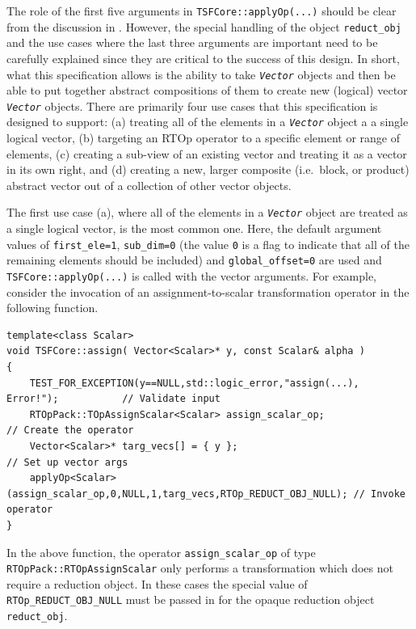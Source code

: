 The role of the first five arguments in \texttt{TSFCore::applyOp(\-...)}
should be clear from the discussion in \cite{ref:rtop_toms}.  However,
the special handling of the object \texttt{reduct\_obj} and the use
cases where the last three arguments are important need to be
carefully explained since they are critical to the success of this
design.  In short, what this specification allows is the ability to
take \texttt{\textit{Vector}} objects and then be able to put together
abstract compositions of them to create new (logical) vector
\texttt{\textit{Vector}} objects.  There are primarily four use cases
that this specification is designed to support: (a) treating all of
the elements in a \texttt{\textit{Vector}} object a a single logical
vector, (b) targeting an RTOp operator to a specific element or range
of elements, (c) creating a sub-view of an existing vector and
treating it as a vector in its own right, and (d) creating a new,
larger composite (i.e.~block, or product) abstract vector out of a
collection of other vector objects.

The first use case (a), where all of the elements in a
\texttt{\textit{Vector}} object are treated as a single logical
vector, is the most common one.  Here, the default argument values of
\texttt{first\_ele=1}, \texttt{sub\_dim=0} (the value \texttt{0} is a
flag to indicate that all of the remaining elements should be
included) and \texttt{global\_offset=0} are used and
\texttt{TSFCore::applyOp(\-...)} is called with the vector arguments.
For example, consider the invocation of an assignment-to-scalar
transformation operator in the following function.

{\scriptsize\begin{verbatim}
template<class Scalar>
void TSFCore::assign( Vector<Scalar>* y, const Scalar& alpha )
{
    TEST_FOR_EXCEPTION(y==NULL,std::logic_error,"assign(...), Error!");           // Validate input
    RTOpPack::TOpAssignScalar<Scalar> assign_scalar_op;                        // Create the operator
    Vector<Scalar>* targ_vecs[] = { y };                                       // Set up vector args
    applyOp<Scalar>(assign_scalar_op,0,NULL,1,targ_vecs,RTOp_REDUCT_OBJ_NULL); // Invoke operator
}
\end{verbatim}}

\noindent In the above function, the operator \texttt{assign\_scalar\_op} of type
\texttt{RTOpPack::RTOpAssignScalar} only performs a transformation which
does not require a reduction object.  In these cases the special value
of \texttt{RTOp\_REDUCT\_OBJ\_NULL} must be passed in for the
opaque reduction object \texttt{reduct\_obj}.

